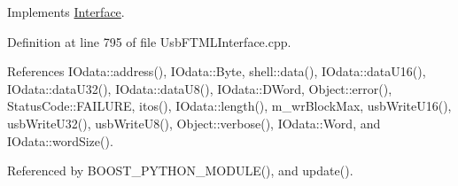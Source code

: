 Implements \hyperlink{classInterface_ad665cacbaf490a26c1c4ba192022e68a}{Interface}.



Definition at line 795 of file Usb\+F\+T\+M\+L\+Interface.\+cpp.



References I\+Odata\+::address(), I\+Odata\+::\+Byte, shell\+::data(), I\+Odata\+::data\+U16(), I\+Odata\+::data\+U32(), I\+Odata\+::data\+U8(), I\+Odata\+::\+D\+Word, Object\+::error(), Status\+Code\+::\+F\+A\+I\+L\+U\+RE, itos(), I\+Odata\+::length(), m\+\_\+wr\+Block\+Max, usb\+Write\+U16(), usb\+Write\+U32(), usb\+Write\+U8(), Object\+::verbose(), I\+Odata\+::\+Word, and I\+Odata\+::word\+Size().



Referenced by B\+O\+O\+S\+T\+\_\+\+P\+Y\+T\+H\+O\+N\+\_\+\+M\+O\+D\+U\+L\+E(), and update().


